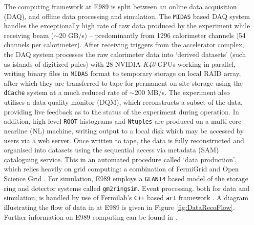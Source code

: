 The computing framework at E989 is split between an online data acquisition (DAQ), and offline data processing and simulation. The \texttt{MIDAS} \cite{MIDAS} based DAQ system handles the exceptionally high rate of raw data produced by the experiment while receiving beam ($\sim$20 GB/s) -- predominantly from 1296 calorimeter channels (54 channels per calorimeter). After receiving triggers from the accelerator complex, the DAQ system processes the raw calorimeter data into `derived datasets' (such as islands of digitized pules) with 28 NVIDIA \textit{K40} GPUs working in parallel, writing binary files in \texttt{MIDAS} format to temporary storage on local RAID array, after which they are transferred to tape for permanent on-site storage using the \texttt{dCache} system at a much reduced rate of $\sim$200 MB/s. The experiment also utilises a data quality monitor (DQM), which reconstructs a subset of the data, providing live feedback as to the status of the experiment during operation. In addition, high level \texttt{ROOT} \cite{ROOT} histograms and \texttt{Ntuples} are produced on a multi-core nearline (NL) machine, writing output to a local disk which may be accessed by users via a web server. Once written to tape, the data is fully reconstructed and organised into datasets using the sequential access via metadata (SAM) \cite{SAM} cataloguing service. This in an automated procedure called `data production', which relies heavily on grid computing: a combination of FermiGrid \cite{FermiGrid} and Open Science Grid \cite{OSG}. For simulation, E989 employs a \texttt{GEANT4} \cite{GEANT4} based model of the storage ring and detector systems called \texttt{gm2ringsim}. Event processing, both for data and simulation, is handled by use of Fermilab's \texttt{C++} based \texttt{art} framework \cite{art}. A diagram illustrating the flow of data in at E989 is given in Figure \ref{fig:DataRecoFlow}. Further information on E989 computing can be found in \cite{KimSiangComputing}.


